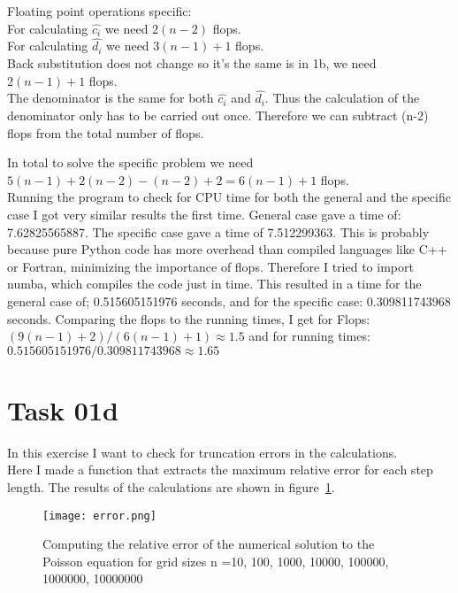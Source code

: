 Floating point operations specific: \\

For calculating $\hat{c_i}$ we need $2(n-2)$ flops. \\
For calculating $\hat{d_i}$ we need $3(n-1)+1$ flops. \\
Back substitution does not change so it's the same is in 1b, we need $2(n-1)+1$ flops. \\

The denominator is the same for both $\hat{c_i}$ and $\hat{d_i}$. Thus the calculation of the denominator only has to be carried out once. Therefore we can subtract (n-2) flops from the total number of flops.


In total to solve the specific problem we need $5(n-1)+2(n-2)-(n-2)+2 = 6(n-1)+1$ flops. \\

Running the program to check for CPU time for both the general and the specific case I got very similar results the first time. General case gave  a time of: 7.62825565887. The specific case gave a time of
7.512299363. This is probably because pure Python code has more overhead than compiled languages like C++ or Fortran, minimizing the importance of flops. Therefore I tried to import numba, which compiles the code just in time. This resulted in a time for the general case of; 0.515605151976 seconds, and for the specific case:
0.309811743968 seconds. Comparing the flops to the running times, I get for Flops: $(9(n-1)+2)/(6(n-1)+1) \approx 1.5$ and for running times: $0.515605151976/0.309811743968 \approx 1.65$\\


\section{Task 01d}
In this exercise I want to check for truncation errors in the calculations.\\

Here I made a function that extracts the maximum relative error for each step length. The results of the calculations are shown in figure~\ref{fig:Error_poisson}.\\

\FloatBarrier
\begin{figure}[!ht]
\centering
\FloatBarrier
\texttt{[image: error.png]}

\caption{Computing the relative error of the numerical solution to the Poisson equation for grid sizes n =10, 100, 1000, 10000, 100000, 1000000, 10000000}
\label{fig:Error_poisson}
\end{figure}
\FloatBarrier

